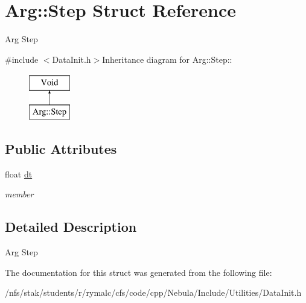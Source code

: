 \hypertarget{structArg_1_1Step}{
\section{Arg::Step Struct Reference}
\label{structArg_1_1Step}
}


Arg Step  


{\ttfamily \#include $<$DataInit.h$>$}Inheritance diagram for Arg::Step::\begin{figure}[H]
\begin{center}
\leavevmode
\includegraphics[height=2cm]{structArg_1_1Step}
\end{center}
\end{figure}
\subsection*{Public Attributes}
\begin{DoxyCompactItemize}
\item 
\hypertarget{structArg_1_1Step_a156568a2c75f28cce8a322abf4d47aaf}{
float \hyperlink{structArg_1_1Step_a156568a2c75f28cce8a322abf4d47aaf}{dt}}
\label{structArg_1_1Step_a156568a2c75f28cce8a322abf4d47aaf}

\begin{DoxyCompactList}\small\item\em member \item\end{DoxyCompactList}\end{DoxyCompactItemize}


\subsection{Detailed Description}
Arg Step 

The documentation for this struct was generated from the following file:\begin{DoxyCompactItemize}
\item 
/nfs/stak/students/r/rymalc/cfs/code/cpp/Nebula/Include/Utilities/DataInit.h\end{DoxyCompactItemize}
